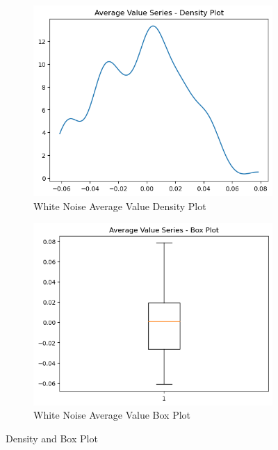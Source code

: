 \documentclass{article}
\begin{document}
\begin{figure}[htbp]
  \centering
  \begin{subfigure}[b]{0.45\textwidth}
    \includegraphics[width=\textwidth]{img/wn_average_value/density_plot.png}
    \caption{White Noise Average Value Density Plot}
    \label{fig:avgvalueedensity}
  \end{subfigure}
  \hfill
  \begin{subfigure}[b]{0.45\textwidth}
    \includegraphics[width=\textwidth]{img/wn_average_value/box_plot.png}
    \caption{White Noise Average Value Box Plot}
    \label{fig:avgvaluebox}
  \end{subfigure}
  \caption{Density and Box Plot}
  \label{fig:avgvalue2}
\end{figure}
\end{document}
